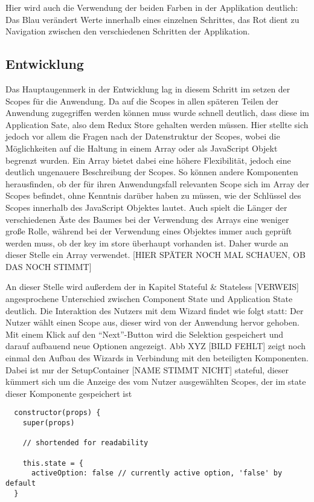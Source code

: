 Hier wird auch die Verwendung der beiden Farben in der Applikation deutlich: Das Blau verändert Werte innerhalb eines einzelnen Schrittes, das Rot dient zu Navigation zwischen den verschiedenen Schritten der Applikation.

\subsection{Entwicklung}
Das Hauptaugenmerk in der Entwicklung lag in diesem Schritt im setzen der Scopes für die Anwendung. Da auf die Scopes in allen späteren Teilen der Anwendung zugegriffen werden können muss wurde schnell deutlich, dass diese im Application Sate, also dem Redux Store gehalten werden müssen. Hier stellte sich jedoch vor allem die Fragen nach der Datenstruktur der Scopes, wobei die Möglichkeiten auf die Haltung in einem Array oder als JavaScript Objekt begrenzt wurden.
Ein Array bietet dabei eine höhere Flexibilität, jedoch eine deutlich ungenauere Beschreibung der Scopes. So können andere Komponenten herausfinden, ob der für ihren Anwendungsfall relevanten Scope sich im Array der Scopes befindet, ohne Kenntnis darüber haben zu müssen, wie der Schlüssel des Scopes innerhalb des JavaScript Objektes lautet. Auch spielt die Länger der verschiedenen Äste des Baumes bei der Verwendung des Arrays eine weniger große Rolle, während bei der Verwendung eines Objektes immer auch geprüft werden muss, ob der key im store überhaupt vorhanden ist. Daher wurde an dieser Stelle ein Array verwendet.
[HIER SPÄTER NOCH MAL SCHAUEN, OB DAS NOCH STIMMT]

An dieser Stelle wird außerdem der in Kapitel Stateful \& Stateless [VERWEIS] angesprochene Unterschied zwischen Component State und Application State deutlich. Die Interaktion des Nutzers mit dem Wizard findet wie folgt statt: Der Nutzer wählt einen Scope aus, dieser wird von der Anwendung hervor gehoben. Mit einem Klick auf den “Next”-Button wird die Selektion gespeichert und darauf aufbauend neue Optionen angezeigt.
Abb XYZ [BILD FEHLT] zeigt noch einmal den Aufbau des Wizards in Verbindung mit den beteiligten Komponenten. Dabei ist nur der SetupContainer [NAME STIMMT NICHT] stateful, dieser kümmert sich um die Anzeige des vom Nutzer ausgewählten Scopes, der im state dieser Komponente gespeichert ist

\begin{lstlisting}
  constructor(props) {
    super(props)

    // shortended for readability

    this.state = {
      activeOption: false // currently active option, 'false' by default
  }
\end{lstlisting}

